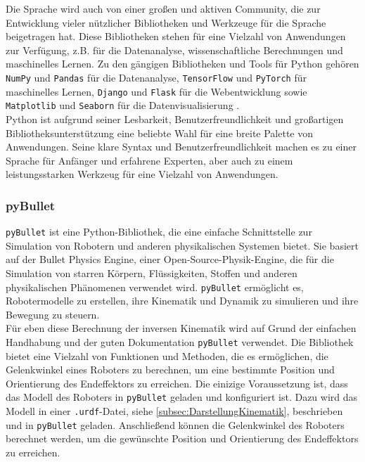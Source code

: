 \noindent
Die Sprache wird auch von einer großen und aktiven Community, die zur Entwicklung vieler nützlicher Bibliotheken und Werkzeuge für die Sprache beigetragen hat. Diese Bibliotheken stehen für eine Vielzahl von Anwendungen zur Verfügung, z.B. für die Datenanalyse, wissenschaftliche Berechnungen und maschinelles Lernen. Zu den gängigen Bibliotheken und Tools für Python gehören \texttt{NumPy} und \texttt{Pandas} für die Datenanalyse, \texttt{TensorFlow} und \texttt{PyTorch} für maschinelles Lernen, \texttt{Django} und \texttt{Flask} für die Webentwicklung sowie \texttt{Matplotlib} und \texttt{Seaborn} für die Datenvisualisierung \cite{PythonDataScienceHandbook}.
\\

\noindent
Python ist aufgrund seiner Lesbarkeit, Benutzerfreundlichkeit und großartigen Bibliotheksunterstützung eine beliebte Wahl für eine breite Palette von Anwendungen. Seine klare Syntax und Benutzerfreundlichkeit machen es zu einer Sprache für Anfänger und erfahrene Experten, aber auch zu einem leistungsstarken Werkzeug für eine Vielzahl von Anwendungen.\\

\subsubsection{pyBullet}\label{subsubsec:pyBullet}
\texttt{pyBullet} ist eine Python-Bibliothek, die eine einfache Schnittstelle zur Simulation von Robotern und anderen physikalischen Systemen bietet. Sie basiert auf der Bullet Physics Engine, einer Open-Source-Physik-Engine, die für die Simulation von starren Körpern, Flüssigkeiten, Stoffen und anderen physikalischen Phänomenen verwendet wird. \texttt{pyBullet} ermöglicht es, Robotermodelle zu erstellen, ihre Kinematik und Dynamik zu simulieren und ihre Bewegung zu steuern.
\\

\noindent
Für eben diese Berechnung der inversen Kinematik wird auf Grund der einfachen Handhabung und der guten Dokumentation \texttt{pyBullet} verwendet. Die Bibliothek bietet eine Vielzahl von Funktionen und Methoden, die es ermöglichen, die Gelenkwinkel eines Roboters zu berechnen, um eine bestimmte Position und Orientierung des Endeffektors zu erreichen. Die einizige Voraussetzung ist, dass das Modell des Roboters in \texttt{pyBullet} geladen und konfiguriert ist. Dazu wird das Modell in einer \texttt{.urdf}-Datei, siehe \autoref{subsec:DarstellungKinematik}, beschrieben und in \texttt{pyBullet} geladen. Anschließend können die Gelenkwinkel des Roboters berechnet werden, um die gewünschte Position und Orientierung des Endeffektors zu erreichen.\\
